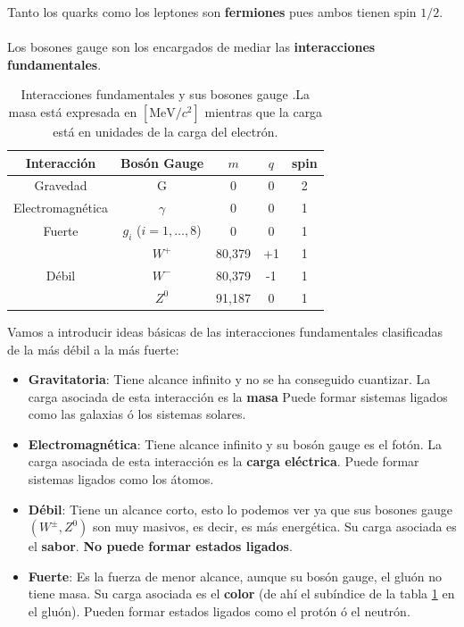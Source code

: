 \noindent Tanto los quarks como los leptones son \textbf{fermiones} pues ambos tienen spin $1/2$.\\\\
Los bosones gauge son los encargados de mediar las \textbf{interacciones fundamentales}. 

\begin{table}[h!]
\centering
\begin{tabular}{|c|c|c|c|c|}
\hline
Interacción & Bosón Gauge & $m$ & $q$ & spin\\
\hline
Gravedad \footnotemark & G & 0 & 0 & 2 \\
\hline
Electromagnética & $\gamma$ & 0 & 0 & 1 \\
\hline
Fuerte & $g_i$ ($i=1,\ldots,8$) & 0 & 0 & 1\\
\hline
\multirow{3}{*}{Débil} & $W^+$ & 80,379 & +1 & 1\\
& $W^-$ & 80,379 & -1 & 1\\
& $Z^0$ & 91,187 & 0 & 1 \\
\hline
\end{tabular}
\caption{Interacciones fundamentales y sus bosones gauge .La masa está expresada en $[\text{MeV}/c^2]$ mientras que la carga está en unidades de la carga del electrón.}
\label{tab:interacciones fundamentales}
\end{table}

Vamos a introducir ideas básicas de las interacciones fundamentales clasificadas de la más débil a la más fuerte:
\begin{itemize}
    \item \textbf{Gravitatoria}: Tiene alcance infinito y no se ha conseguido cuantizar. La carga asociada de esta interacción es la \textbf{masa} Puede formar sistemas ligados como las galaxias ó los sistemas solares.
    \item \textbf{Electromagnética}: Tiene alcance infinito y su bosón gauge es el fotón. La carga asociada de esta interacción es la \textbf{carga eléctrica}. Puede formar sistemas ligados como los átomos.
    \item \textbf{Débil}: Tiene un alcance corto, esto lo podemos ver ya que sus bosones gauge $(W^\pm,Z^0)$ son muy masivos, es decir, es más energética. Su carga asociada es el \textbf{sabor}. \textbf{No puede formar estados ligados}.
    \item \textbf{Fuerte}: Es la fuerza de menor alcance, aunque su bosón gauge, el gluón no tiene masa. Su carga asociada es el \textbf{color} (de ahí el subíndice de la tabla \ref{tab:interacciones fundamentales} en el gluón). Pueden formar estados ligados como el protón ó el neutrón.
\end{itemize}
